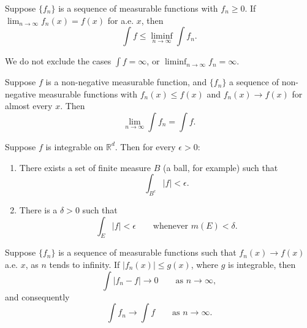 \begin{lemma}[Fatou]
  Suppose $\{f_n\}$ is a sequence of measurable functions with $f_n \geq 0$.
  If $\lim_{n \to \infty} f_n(x) = f(x)$ for a.e. $x$, then
  \begin{equation}
    \int f \le \liminf_{n \to \infty} \int f_n.
  \end{equation}
\end{lemma}

\begin{remark}
  We do not exclude the cases $\int f = \infty$,
  or $\liminf_{n \to \infty} f_n = \infty$.
\end{remark}

\begin{corollary}
  Suppose $f$ is a non-negative measurable function, and $\{f_n\}$ a sequence
  of non-negative measurable functions with
  $f_n(x) \le f(x)$ and $f_n(x) \to f(x)$ for almost every $x$. Then
  \begin{equation}
    \lim_{n \to \infty} \int f_n = \int f.
  \end{equation}
\end{corollary}

\begin{proposition}
  Suppose $f$ is integrable on $\mathbb{R}^d$. Then for every $\epsilon > 0$:
  \begin{enumerate}
    \renewcommand{\theenumi}{\roman{enumi}}
    \item There exists a set of finite measure $B$ (a ball, for example) such
      that
      \begin{equation}
        \int_{B^c} |f| < \epsilon.
      \end{equation}
    \item There is a $\delta > 0$ such that
      \begin{equation}
        \int_E |f| < \epsilon \qquad \text{whenever } m(E) < \delta.
      \end{equation}
  \end{enumerate}
\end{proposition}

\begin{theorem}
  Suppose $\{f_n\}$ is a sequence of measurable functions such that
  $f_n(x) \to f(x)$ a.e. $x$, as $n$ tends to infinity.
  If $|f_n(x)| \le g(x)$, where $g$ is integrable, then
  \begin{equation}
    \int |f_n - f| \to 0 \qquad \text{as } n \to \infty,
  \end{equation}
  and consequently
  \begin{equation}
    \int f_n \to \int f \qquad \text{as } n \to \infty.
  \end{equation}
\end{theorem}

